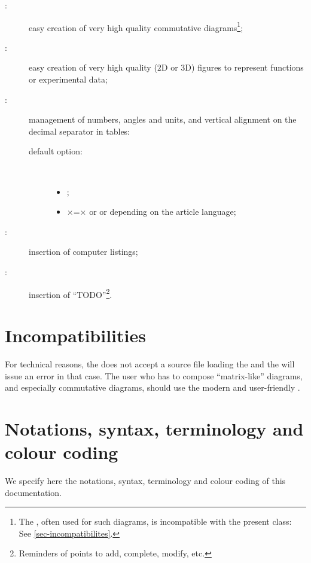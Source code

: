 \documentclass[english,nolocaltoc]{nwejmart}
\newtheorem[style=definition]{fact}
\newtheorem[title=experience]{experience}
\newtheorem[title-plural=rings]{ring}
\newtheorem[title=ideal,title-plural=ideals]{ideal}
\begin{document}
\begin{description}
\item[:] easy creation of very high quality
  commutative diagrams\footnote{The , often used for such
    diagrams, is incompatible with the  present class:
    See \vref{sec-incompatibilites}.};
\item[:] easy creation of very high quality ($2$D
  or $3$D) figures to represent functions or experimental data;
\item[:] management of numbers, angles and units, and vertical
  alignment on the  decimal separator in tables:
  \begin{description}
  \item[default option:]\
    \begin{itemize}
    \item {};
    \item {}×=× or  or 
      depending on the article language;
    \end{itemize}
  \end{description}
\item[:] insertion of computer listings;
\item[:] insertion of
  \enquote{TODO}\footnote{Reminders of points to add, complete,
    modify, etc.}.
\end{description}

\section{Incompatibilities}
\label{sec-incompatibilites}

For technical reasons, the \nwejm{} does not accept a 
source file loading the \Package{xy} and the  \nwejmauthor{} will
issue an error in that case. The user who has to compose
\enquote{matrix-like} diagrams, and especially commutative diagrams,
should use the modern and user-friendly \Package{tikz-cd}.

\section{Notations, syntax, terminology and colour coding}\label{sec-synt-term-notat}

We specify here the  notations, syntax, terminology and colour coding
of this documentation.
\end{document}
